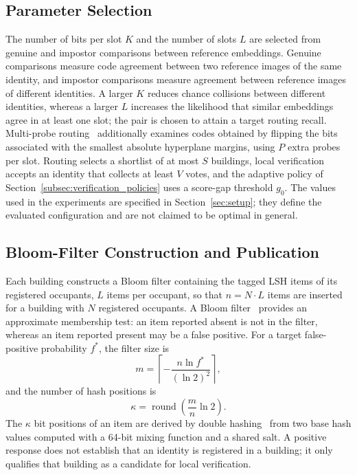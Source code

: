 \documentclass[pdflatex,sn-mathphys-num]{sn-jnl}%
\theoremstyle{thmstyleone}%
\theoremstyle{thmstyletwo}%
\theoremstyle{thmstylethree}%
\begin{document}
\subsection{Parameter Selection}
\label{subsec:parameter_selection}

The number of bits per slot $K$ and the number of slots $L$ are selected from genuine and impostor comparisons between reference embeddings. Genuine comparisons measure code agreement between two reference images of the same identity, and impostor comparisons measure agreement between reference images of different identities. A larger $K$ reduces chance collisions between different identities, whereas a larger $L$ increases the likelihood that similar embeddings agree in at least one slot; the pair is chosen to attain a target routing recall. Multi-probe routing~\cite{lv2007} additionally examines codes obtained by flipping the bits associated with the smallest absolute hyperplane margins, using $P$ extra probes per slot. Routing selects a shortlist of at most $S$ buildings, local verification accepts an identity that collects at least $V$ votes, and the adaptive policy of Section~\ref{subsec:verification_policies} uses a score-gap threshold $g_0$. The values used in the experiments are specified in Section~\ref{sec:setup}; they define the evaluated configuration and are not claimed to be optimal in general.

\subsection{Bloom-Filter Construction and Publication}
\label{subsec:bloom_filter}

Each building constructs a Bloom filter containing the tagged LSH items of its registered occupants, $L$ items per occupant, so that $n=N\cdot L$ items are inserted for a building with $N$ registered occupants. A Bloom filter~\cite{bloom1970} provides an approximate membership test: an item reported absent is not in the filter, whereas an item reported present may be a false positive. For a target false-positive probability $f^*$, the filter size is
\begin{equation}
    m =
    \left\lceil
    -\frac{n\ln f^*}{(\ln 2)^2}
    \right\rceil,
    \label{eq:bloom_size}
\end{equation}
and the number of hash positions is
\begin{equation}
    \kappa =
    \operatorname{round}
    \left(\frac{m}{n}\ln 2\right).
    \label{eq:bloom_hash_count}
\end{equation}
The $\kappa$ bit positions of an item are derived by double hashing~\cite{kirsch2006} from two base hash values computed with a 64-bit mixing function and a shared salt. A positive response does not establish that an identity is registered in a building; it only qualifies that building as a candidate for local verification.
\end{document}
